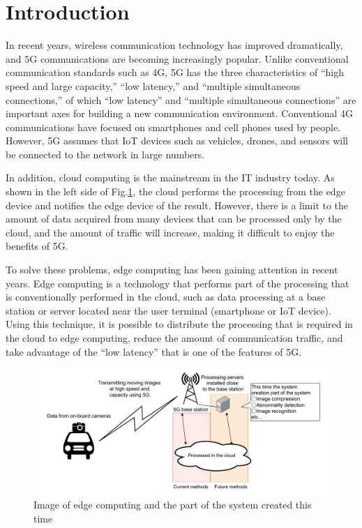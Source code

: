 \documentclass[conference]{IEEEtran}
\begin{document}
\section{Introduction}
In recent years, wireless communication technology has improved dramatically, and 5G communications are becoming increasingly popular.
Unlike conventional communication standards such as 4G, 5G has the three characteristics of “high speed and large capacity,” “low latency,” and “multiple simultaneous connections,” of which “low latency” and “multiple simultaneous connections” are important axes for building a new communication environment.
Conventional 4G communications have focused on smartphones and cell phones used by people.
However, 5G assumes that IoT devices such as vehicles, drones, and sensors will be connected to the network in large numbers.

In addition, cloud computing is the mainstream in the IT industry today\cite{jyotu-haku}.
As shown in the left side of Fig.\ref{fig:1-1}, the cloud performs the processing from the edge device and notifies the edge device of the result.
However, there is a limit to the amount of data acquired from many devices that can be processed only by the cloud, and the amount of traffic will increase, making it difficult to enjoy the benefits of 5G.

To solve these problems, edge computing has been gaining attention in recent years.
Edge computing is a technology that performs part of the processing that is conventionally performed in the cloud, such as data processing at a base station or server located near the user terminal (smartphone or IoT device)\cite{edge-com}\cite{nec-edge}.
Using this technique, it is possible to distribute the processing that is required in the cloud to edge computing, reduce the amount of communication traffic, and take advantage of the “low latency” that is one of the features of 5G.

\begin{figure}[tb]
    \begin{center}
        \includegraphics[width=0.98\columnwidth]{figures/Intr_1.pdf}
    \end{center}
    \caption{Image of edge computing and the part of the system created this time}
    \label{fig:1-1}
\end{figure}
\end{document}
